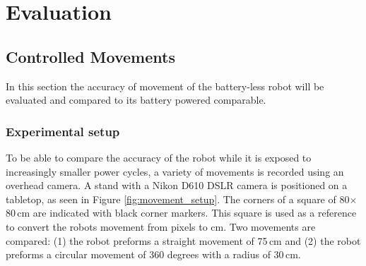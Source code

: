 \chapter{Evaluation}
\label{chp:evaluation}

\section{Controlled Movements}
\label{sec:controlled_movements}




In this section the accuracy of movement of the battery-less robot will be evaluated and compared to its battery powered comparable.

\subsection{Experimental setup}

To be able to compare the accuracy of the robot while it is exposed to increasingly smaller power cycles, a variety of movements is recorded using an overhead camera.
A stand with a Nikon D610 DSLR camera is positioned on a tabletop, as seen in Figure \ref{fig:movement_setup}.
The corners of a square of 80$\times$80\,cm are indicated with black corner markers.
This square is used as a reference to convert the robots movement from pixels to cm.
Two movements are compared: (1) the robot preforms a straight movement of 75\,cm and (2) the robot preforms a circular movement of 360 degrees with a radius of 30\,cm.

